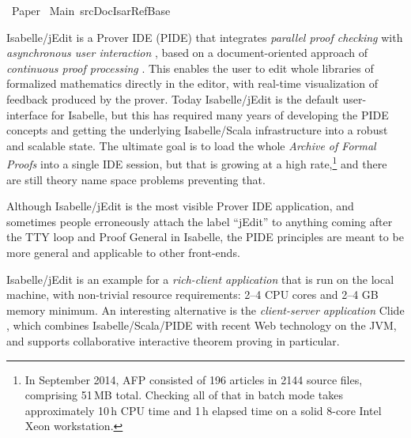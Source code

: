 \begin{isabellebody}\def\isabellecontext{Paper}\isadelimtheory
\endisadelimtheory
\isatagtheory
{}\isamarkupfalse \ Paper\isanewline
{}\ Main\ {\isachardoublequoteopen}{\isachartilde}{\isachartilde}{\isacharslash}src{\isacharslash}Doc{\isacharslash}Isar{\isacharunderscore}Ref{\isacharslash}Base{\isachardoublequoteclose}\isanewline
{}\endisatagtheory
{\isafoldtheory}\isadelimtheory
\endisadelimtheory
{}
\isamarkuptrue \begin{isamarkuptext}Isabelle/jEdit is a Prover IDE (PIDE) that integrates \emph{parallel
proof checking} \cite{Wenzel:2009,Wenzel:2013:ITP} with \emph{asynchronous
user interaction}
\cite{Wenzel:2010,Wenzel:2012:UITP-EPTCS,Wenzel:2014:ITP-PIDE}, based on a
document-oriented approach of \emph{continuous proof processing}
\cite{Wenzel:2011:CICM,Wenzel:2012:CICM}. This enables the user to edit
whole libraries of formalized mathematics directly in the editor, with
real-time visualization of feedback produced by the prover. Today
Isabelle/jEdit is the default user-interface for Isabelle, but this has
required many years of developing the PIDE concepts and getting the
underlying Isabelle/Scala infrastructure into a robust and scalable state.
The ultimate goal is to load the whole \emph{Archive of Formal Proofs}
\cite{AFP} into a single IDE session, but that is growing at a high
rate,\footnote{In September 2014, AFP consisted of 196 articles in 2144
source files, comprising 51\,MB total. Checking all of that in batch mode
takes approximately 10\,h CPU time and 1\,h elapsed time on a solid 8-core
Intel Xeon workstation.} and there are still theory name space problems
preventing that.

\medskip Although Isabelle/jEdit is the most visible Prover IDE application,
and sometimes people erroneously attach the label ``jEdit'' to anything
coming after the TTY loop and Proof General \cite{Aspinall:TACAS:2000} in
Isabelle, the PIDE principles are meant to be more general and applicable to
other front-ends.

Isabelle/jEdit is an example for a \emph{rich-client application} that is
run on the local machine, with non-trivial resource requirements: 2--4 CPU
cores and 2--4 GB memory minimum. An interesting alternative is the
\emph{client-server application} Clide
\cite{Lueth-Ring:2013,Lueth-Ring:2014}, which combines Isabelle/Scala/PIDE
with recent Web technology on the JVM, and supports collaborative
interactive theorem proving in particular.


\end{isamarkuptext}
\end{isabellebody}
